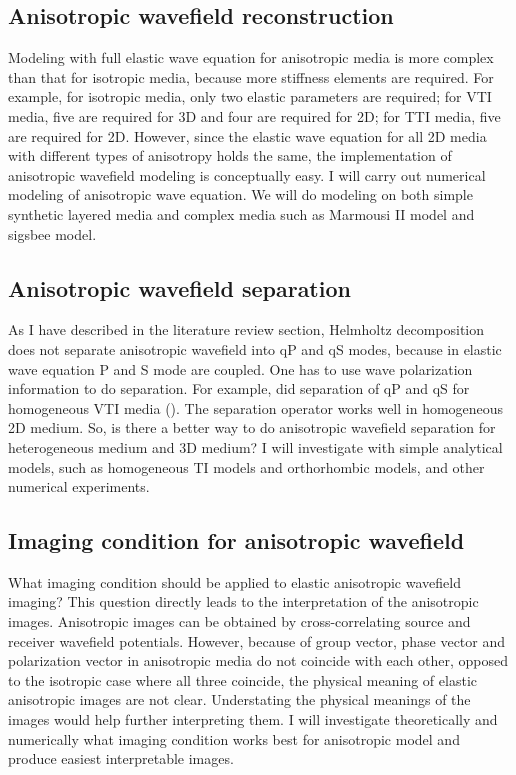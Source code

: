 



\subsection{Anisotropic wavefield reconstruction}
Modeling with full elastic wave equation for anisotropic media is more complex than that for isotropic media, because more stiffness elements are required. For example, for isotropic media, only two elastic parameters are required; for VTI media, five are required for 3D and four are required for 2D; for TTI media, five are required for 2D. However, since the elastic wave equation for all 2D media with different types of anisotropy holds the same, the implementation of anisotropic wavefield modeling is conceptually easy. I will carry out numerical modeling of anisotropic wave equation. We will do modeling on both simple synthetic layered media and complex media such as Marmousi II model and sigsbee model.

\subsection{Anisotropic wavefield separation}
As I have described in the literature review section, Helmholtz decomposition does not separate anisotropic wavefield into qP and qS modes, because in elastic wave equation P and S mode are coupled. One has to use wave polarization information to do separation. For example, \cite[]{GEO55-07-09140919} did separation of qP and qS for homogeneous VTI media (). The separation operator works well in homogeneous 2D medium. So, is there a better way to do anisotropic wavefield separation for heterogeneous medium and 3D medium? 
I will investigate with simple analytical models, such as homogeneous TI models and orthorhombic models, and other numerical experiments.


\subsection{Imaging condition for anisotropic wavefield}
What imaging condition should be applied to elastic anisotropic wavefield imaging? This question directly leads to the interpretation of the anisotropic images. 
Anisotropic images can be obtained by cross-correlating source and receiver wavefield potentials. However, because of group vector, phase vector and polarization vector in anisotropic media do not coincide with each other, opposed to the isotropic case where all three coincide, the physical meaning of elastic anisotropic images are not clear. Understating the physical meanings of the images would help further interpreting them. I will investigate theoretically and numerically what imaging condition works best for anisotropic model and produce easiest interpretable images.

